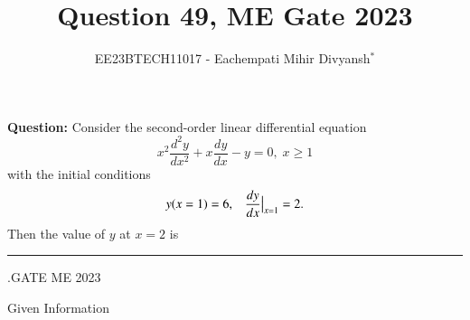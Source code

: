 \documentclass[journal,12pt,twocolumn]{IEEEtran}
\theoremstyle{remark}
\begin{document}

\vspace{3cm}

\title{Question 49, ME Gate 2023}
\author{EE23BTECH11017 - Eachempati Mihir Divyansh$^{*}$}
\maketitle
\newpage
\bigskip

\renewcommand{\thefigure}{\theenumi}
\renewcommand{\thetable}{\theenumi}
\textbf{Question:} Consider the second-order linear differential equation
\[x^2\frac{d^2y}{dx^2}+x\frac{dy}{dx}-y=0, \; x\geq 1\]
with the initial conditions $$y(x=1)=6,\; \;\; \frac{dy}{dx}\big{|}_{x=1}=2.$$
Then the value of $y$ at $x=2$ is \rule{2cm}{0.1mm}.{\hfill{GATE ME 2023}}\\

\solution
\begin{table}[h!]
    \centering
    
    \caption{Given Information} \label{gateME49.tab:1}
\end{table}
\end{document}
